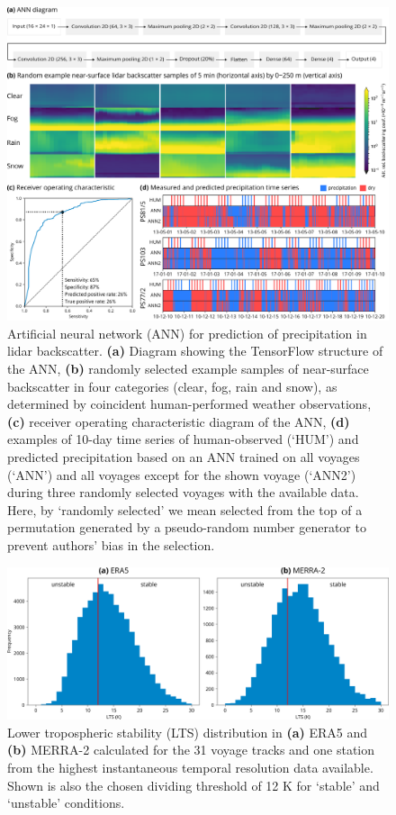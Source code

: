 \documentclass[12pt,a4paper]{article}
\begin{document}
\begin{figure}
\centering
\includegraphics[width=\textwidth]{img/ann.pdf}
\caption{
Artificial neural network (ANN) for prediction of precipitation in lidar
backscatter. \textbf{(a)} Diagram showing the TensorFlow structure of the ANN,
\textbf{(b)} randomly selected example samples of near-surface backscatter in
four categories (clear, fog, rain and snow), as determined by coincident
human-performed weather observations, \textbf{(c)} receiver operating
characteristic diagram of the ANN, \textbf{(d)} examples of 10-day time series
of human-observed (`HUM') and predicted precipitation based on an ANN trained
on all voyages (`ANN') and all voyages except for the shown voyage (`ANN2')
during three randomly selected voyages with the available data. Here, by
`randomly selected' we mean selected from the top of a permutation generated by
a pseudo-random number generator to prevent authors' bias in the selection.
}
\label{fig:ann}
\end{figure}

\begin{figure}
\centering
\includegraphics[width=\textwidth]{img/lts_dist.pdf}
\caption{
Lower tropospheric stability (LTS) distribution in \textbf{(a)} ERA5 and
\textbf{(b)} MERRA-2 calculated for the 31 voyage tracks and one station from
the highest instantaneous temporal resolution data available. Shown is also the
chosen dividing threshold of 12 K for `stable' and `unstable' conditions.
}
\label{fig:lts}
\end{figure}
\end{document}
